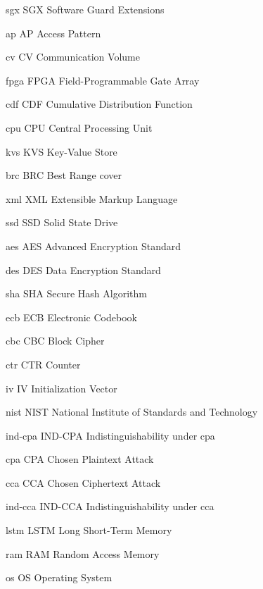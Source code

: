 \newacronym%
	{sgx}
	{SGX}
	{Software Guard Extensions}

\newacronym%
	{ap}
	{AP}
	{Access Pattern}

\newacronym%
	{cv}
	{CV}
	{Communication Volume}

\newacronym%
	{fpga}
	{FPGA}
	{Field-Programmable Gate Array}

\newacronym%
	{cdf}
	{CDF}
	{Cumulative Distribution Function}

\newacronym%
	{cpu}
	{CPU}
	{Central Processing Unit}

\newacronym%
	{kvs}
	{KVS}
	{Key-Value Store}

\newacronym%
	{brc}
	{BRC}
	{Best Range cover}

\newacronym%
	{xml}
	{XML}
	{Extensible Markup Language}

\newacronym%
	{ssd}
	{SSD}
	{Solid State Drive}

\newacronym%
	{aes}
	{AES}
	{Advanced Encryption Standard}

\newacronym%
	{des}
	{DES}
	{Data Encryption Standard}

\newacronym%
	{sha}
	{SHA}
	{Secure Hash Algorithm}

\newacronym%
	{ecb}
	{ECB}
	{Electronic Codebook}

\newacronym%
	{cbc}
	{CBC}
	{Block Cipher}

\newacronym%
	{ctr}
	{CTR}
	{Counter}

\newacronym%
	{iv}
	{IV}
	{Initialization Vector}

\newacronym%
	{nist}
	{NIST}
	{National Institute of Standards and Technology}

\newacronym%
	{ind-cpa}
	{IND-CPA}
	{Indistinguishability under \acrlong{cpa}}

\newacronym%
	{cpa}
	{CPA}
	{Chosen Plaintext Attack}

\newacronym%
	{cca}
	{CCA}
	{Chosen Ciphertext Attack}

\newacronym%
	{ind-cca}
	{IND-CCA}
	{Indistinguishability under \acrlong{cca}}

\newacronym%
	{lstm}
	{LSTM}
	{Long Short-Term Memory}

\newacronym%
	{ram}
	{RAM}
	{Random Access Memory}

\newacronym%
	{os}
	{OS}
	{Operating System}


